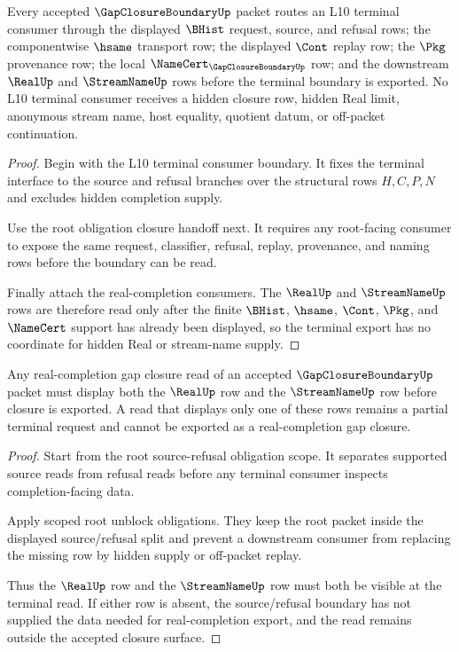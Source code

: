 \begin{theorem}
\label{thm:gap-closure-boundary-l10-terminal-obligation-pack}
Every accepted $\GapClosureBoundaryUp$ packet routes an L10 terminal consumer through the displayed $\BHist$ request, source, and refusal rows; the componentwise $\hsame$ transport row; the displayed $\Cont$ replay row; the $\Pkg$ provenance row; the local $\NameCert_{\GapClosureBoundaryUp}$ row; and the downstream $\RealUp$ and $\StreamNameUp$ rows before the terminal boundary is exported. No L10 terminal consumer receives a hidden closure row, hidden Real limit, anonymous stream name, host equality, quotient datum, or off-packet continuation.
\end{theorem}
\begin{proof}
Begin with the L10 terminal consumer boundary. It fixes the terminal interface to the source and refusal branches over the structural rows $H,C,P,N$ and excludes hidden completion supply.

Use the root obligation closure handoff next. It requires any root-facing consumer to expose the same request, classifier, refusal, replay, provenance, and naming rows before the boundary can be read.

Finally attach the real-completion consumers. The $\RealUp$ and $\StreamNameUp$ rows are therefore read only after the finite $\BHist$, $\hsame$, $\Cont$, $\Pkg$, and $\NameCert$ support has already been displayed, so the terminal export has no coordinate for hidden Real or stream-name supply.
\end{proof}

\begin{theorem}
\label{thm:gap-closure-boundary-real-streamname-dependency}
Any real-completion gap closure read of an accepted $\GapClosureBoundaryUp$ packet must display both the $\RealUp$ row and the $\StreamNameUp$ row before closure is exported. A read that displays only one of these rows remains a partial terminal request and cannot be exported as a real-completion gap closure.
\end{theorem}
\begin{proof}
Start from the root source-refusal obligation scope. It separates supported source reads from refusal reads before any terminal consumer inspects completion-facing data.

Apply scoped root unblock obligations. They keep the root packet inside the displayed source/refusal split and prevent a downstream consumer from replacing the missing row by hidden supply or off-packet replay.

Thus the $\RealUp$ row and the $\StreamNameUp$ row must both be visible at the terminal read. If either row is absent, the source/refusal boundary has not supplied the data needed for real-completion export, and the read remains outside the accepted closure surface.
\end{proof}

